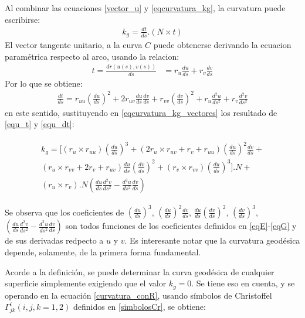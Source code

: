 \documentclass{endm}
\begin{document}
Al combinar las ecuaciones  \ref{vector_u} y \ref{eqcurvatura_kg}, la curvatura puede escribirse:
{\small
\begin{align} 
k_g = \frac{dt}{ds} . (N \times t)
 \label{eqcurvatura_kg_vectores}
\end{align}
}
El vector tangente unitario, a la curva $C$ puede obtenerse derivando la ecuacion param\'etrica respecto al arco, usando la relacion:
\small{
\begin{align} 
t = \frac{d r(u(s), v(s))}{ds}&=r_u \frac{d u}{ds} + r_v \frac{d v}{ds}
 \label{equ_t}
\end{align}
}
Por lo que se obtiene:
\small{
\begin{align} 
 \frac{d t}{ds} = r_{uu} (\frac{d u}{ds})^2 +
 2 r_{uv} \frac{d u}{ds} \frac{d v}{ds}
 + r_{vv} (\frac{d v}{ds})^2 +
 r_u \frac{d^2 u}{ds^2} +
 r_v \frac{d^2 v}{ds^2}
 \label{equ_dt}
\end{align}
}
en este sentido, sustituyendo en \ref{eqcurvatura_kg_vectores} los resultado de \ref{equ_t} y \ref{equ_dt}:

{\small
\begin{align} 
\begin{split}
k_g = [ 
(r_u \times r_{uu}) (\frac{d u}{ds})^3 + 
(2 r_u \times r_{uv} + r_v + r_{uu} ) (\frac{d u}{ds})^2 \frac{dv}{ds} + \\
(r_u \times r_{vv} + 2 r_v + r_{uv})  \frac{d u}{ds} (\frac{d v}{ds})^2 + 
(r_v \times r_{vv}) (\frac{d u}{ds})^3
] . N + \\
(r_u \times r_{v}) . N (\frac{d u}{ds} \frac{d^2 v}{ds^2} - \frac{d^ 2 u}{ds^2 } \frac{d v}{ds})
\label{curvatura_conR}
\end{split}
\end{align}
}
 
 
Se observa que los coeficientes de $(\frac{d u}{ds})^3$, 
$(\frac{d u}{ds})^2 \frac{d v}{ds}$, $\frac{d u}{ds} (\frac{d v}{ds})^2$,  
$(\frac{d v}{ds})^3$,
$(\frac{d u}{ds} \frac{d^2 v}{ds^2} - \frac{d^2 u}{ds^2} \frac{d v}{ds} ) $
son todos funciones de los coeficientes definidos en \ref{eqE}-\ref{eqG} y de sus derivadas redpecto a $u$ y $v$. Es interesante notar que la curvatura geod\'esica depende, solamente, de la primera forma fundamental.

Acorde a la definici\'on, se puede determinar la curva geod\'esica de cualquier superficie simplemente exigiendo que el valor $k_g = 0$. Se tiene eso en cuenta, y se operando en la ecuaci\'on \ref{curvatura_conR}, usando s\'imbolos de Christoffel $\Gamma_{jk}^i (i,j,k=1,2)$ definidos en \ref{simbolosCr}, se obtiene:
\end{document}
